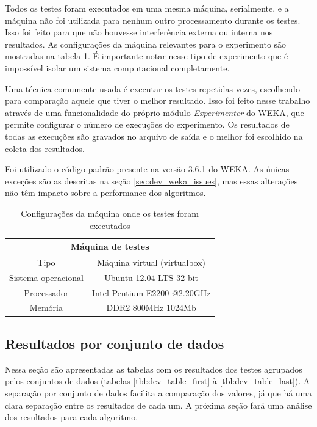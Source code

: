 Todos os testes foram executados em uma mesma máquina, serialmente, e a máquina não foi utilizada para nenhum outro processamento durante os testes. Isso foi feito para que não houvesse interferência externa ou interna nos resultados. As configurações da máquina relevantes para o experimento são mostradas na tabela \ref{tbl:dev_machine_specs}. É importante notar nesse tipo de experimento que é impossível isolar um sistema computacional completamente.

Uma técnica comumente usada é executar os testes repetidas vezes, escolhendo para comparação aquele que tiver o melhor resultado. Isso foi feito nesse trabalho através de uma funcionalidade do próprio módulo \emph{Experimenter} do WEKA, que permite configurar o número de execuções do experimento. Os resultados de todas as execuções são gravados no arquivo de saída e o melhor foi escolhido na coleta dos resultados.

Foi utilizado o código padrão presente na versão 3.6.1 do WEKA. As únicas exceções são as descritas na seção \ref{sec:dev_weka_issues}, mas essas alterações não têm impacto sobre a performance dos algoritmos.

\vspace{0.5cm}
\begin{table}[h]
    \scriptsize
    \centering
    \caption{Configurações da máquina onde os testes foram executados}
    \label{tbl:dev_machine_specs}
    \vspace{0.5cm}
    \begin{tabular}{c c}
        \multicolumn{2}{c}{\textbf{Máquina de testes}}     \\
        \hline
        Tipo                & Máquina virtual (virtualbox) \\
        Sistema operacional & Ubuntu 12.04 LTS 32-bit      \\
        Processador         & Intel Pentium E2200 @2.20GHz \\
        Memória             & DDR2 800MHz 1024Mb           \\
    \end{tabular}
\end{table}
\vspace{0.5cm}

\subsection{Resultados por conjunto de dados}

Nessa seção são apresentadas as tabelas com os resultados dos testes agrupados pelos conjuntos de dados (tabelas \ref{tbl:dev_table_first} à \ref{tbl:dev_table_last}). A separação por conjunto de dados facilita a comparação dos valores, já que há uma clara separação entre os resultados de cada um. A próxima seção fará uma análise dos resultados para cada algoritmo.

